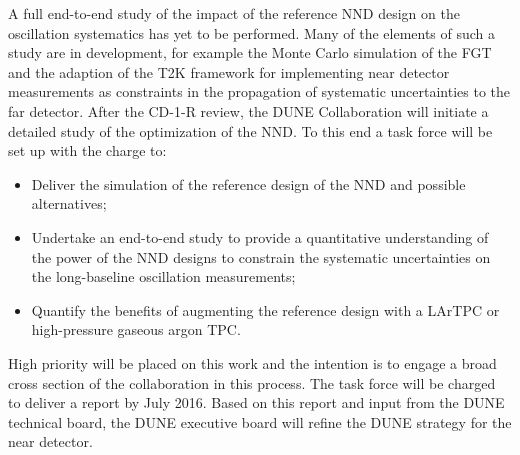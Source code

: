 A full end-to-end study of the impact of the reference NND 
design on the
oscillation systematics has yet to be performed. Many of the elements
of such a study are in development, for example the Monte Carlo
simulation of the FGT and the adaption of the T2K framework for
implementing near detector measurements as constraints in the propagation of
systematic uncertainties to the far detector.  After the CD-1-R review, the DUNE
Collaboration will initiate a detailed study of the optimization of
the NND. %
To this end a task force will be set up with the
charge to:
\begin{itemize}
\item Deliver the simulation of the reference design of the NND and
  possible alternatives;
\item Undertake an end-to-end study to provide a quantitative
  understanding of the power of the NND designs to constrain the
  systematic uncertainties on the long-baseline oscillation measurements;
\item Quantify the benefits of augmenting the reference design with
  a LArTPC or high-pressure gaseous argon TPC.
\end{itemize}
High priority will be placed on this work and the intention is to
engage a broad cross section of the collaboration in this process. The
task force will be charged to deliver a report by July 2016. Based on
this report and input from the DUNE technical board,
the DUNE executive board will refine the DUNE strategy for the near
detector. 
